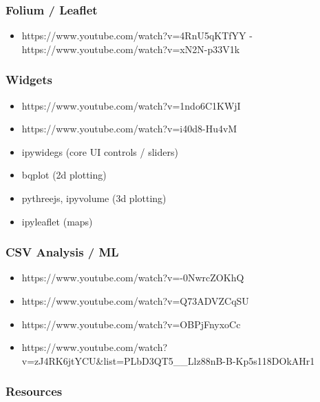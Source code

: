 \documentclass[11pt]{article}
\providecommand{\tightlist}{%
      \setlength{\itemsep}{0pt}\setlength{\parskip}{0pt}}
\begin{document}
\subsubsection{Folium / Leaflet}\label{folium-leaflet}

\begin{itemize}
\tightlist
\item
  https://www.youtube.com/watch?v=4RnU5qKTfYY
  -https://www.youtube.com/watch?v=xN2N-p33V1k
\end{itemize}

\subsubsection{Widgets}\label{widgets}

\begin{itemize}
\tightlist
\item
  https://www.youtube.com/watch?v=1ndo6C1KWjI
\item
  https://www.youtube.com/watch?v=i40d8-Hu4vM
\item
  ipywidegs (core UI controls / sliders)
\item
  bqplot (2d plotting)
\item
  pythreejs, ipyvolume (3d plotting)
\item
  ipyleaflet (maps)
\end{itemize}

\subsubsection{CSV Analysis / ML}\label{csv-analysis-ml}

\begin{itemize}
\tightlist
\item
  https://www.youtube.com/watch?v=-0NwrcZOKhQ
\item
  https://www.youtube.com/watch?v=Q73ADVZCqSU
\item
  https://www.youtube.com/watch?v=OBPjFnyxoCc
\item
  https://www.youtube.com/watch?v=zJ4RK6jtYCU\&list=PLbD3QT5\_\_Llz88nB-B-Kp5s118DOkAHr1
\end{itemize}

\subsubsection{Resources}\label{resources}
\end{document}
